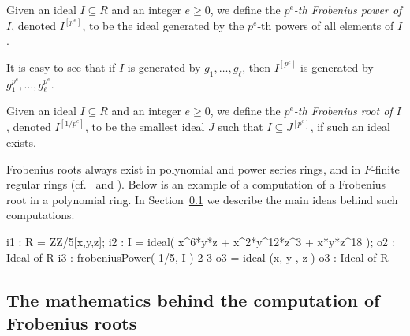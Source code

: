 \documentclass{amsart}
\renewcommand{\geq}{\geqslant}
\begin{document}
\begin{definition}
Given an ideal $I\subseteq R$ and an integer $e\geq 0$, we define the \emph{$p^e$-th Frobenius power of $I$}, denoted $I^{[p^e]}$, to be the ideal
generated by the $p^e$-th powers of all elements of $I$.
\end{definition}

It is easy to see that if $I$ is generated by $g_1, \dots, g_\ell$, then $I^{[p^e]}$ is generated by $g_1^{p^e}, \dots, g_\ell^{p^e}$.


\begin{definition}
Given an ideal $I\subseteq R$ and an integer $e\geq 0$, we define the \emph{$p^e$-th Frobenius root of $I$}, denoted $I^{[1/p^{e}]}$, to be the smallest ideal $J$ such that $I\subseteq J^{[p^e]}$, if such an ideal exists.
\end{definition}

Frobenius roots always exist in polynomial and power series rings, and in $F$-finite regular rings
(cf.~\cite[\S 2]{BlickleMustataSmithDiscretenessAndRationalityOfFThresholds} and \cite[\S 5]{KatzmanParameterTestIdealOfCMRings}).
Below is an example of a computation of a Frobenius root in a polynomial ring.
In Section~\ref{ss: math behind} we describe the main ideas behind such computations.

\medskip
{\small
\begin{MyVerbatim}
i1 : R = ZZ/5[x,y,z];
i2 : I = ideal( x^6*y*z + x^2*y^12*z^3 + x*y*z^18 );
o2 : Ideal of R
i3 : frobeniusPower( 1/5, I )
                2   3
o3 = ideal (x, y , z )
o3 : Ideal of R
\end{MyVerbatim}
}
\medskip

\subsection{The mathematics behind the computation of Frobenius roots}
\label{ss: math behind}
\end{document}
